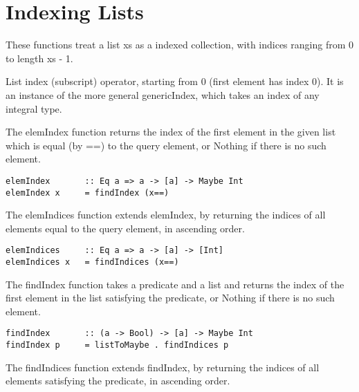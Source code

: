 \section{Indexing Lists}
These functions treat a list xs as a indexed collection, with indices ranging from 0 to length xs - 1.

List index (subscript) operator, starting from 0 (first element has index 0). It is an instance of the more general genericIndex, which takes an index of any integral type.

The elemIndex function returns the index of the first element in the given list which is equal (by ==) to the query element, or Nothing if there is no such element.
\begin{lstlisting}[frame=single]
elemIndex       :: Eq a => a -> [a] -> Maybe Int
elemIndex x     = findIndex (x==)
\end{lstlisting}

The elemIndices function extends elemIndex, by returning the indices of all elements equal to the query element, in ascending order.
\begin{lstlisting}[frame=single]
elemIndices     :: Eq a => a -> [a] -> [Int]
elemIndices x   = findIndices (x==)
\end{lstlisting}

The findIndex function takes a predicate and a list and returns the index of the first element in the list satisfying the predicate, or Nothing if there is no such element.
\begin{lstlisting}[frame=single]
findIndex       :: (a -> Bool) -> [a] -> Maybe Int
findIndex p     = listToMaybe . findIndices p
\end{lstlisting}

The findIndices function extends findIndex, by returning the indices of all elements satisfying the predicate, in ascending order.
\skipped